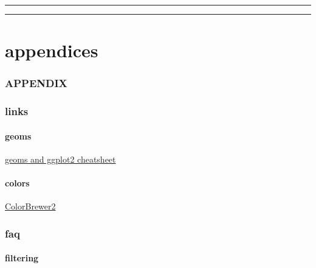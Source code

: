\documentclass[
]{krantz}
\begin{document}
\begin{center}\rule{0.5\linewidth}{0.5pt}\end{center}

\begin{center}\rule{0.5\linewidth}{0.5pt}\end{center}

\hypertarget{part-appendices}{%
\part{appendices}\label{part-appendices}}

\hypertarget{section-1}{%
\section*{}\label{section-1}}

\hypertarget{appendix}{%
\section*{APPENDIX}\label{appendix}}

\hypertarget{links}{%
\section{links}\label{links}}

\hypertarget{geoms-1}{%
\subsection{geoms}\label{geoms-1}}

\href{https://thebustalab.github.io/R_For_Chemists_3/images/ggplot2_geoms.pdf}{geoms and ggplot2 cheatsheet}

\hypertarget{colors}{%
\subsection{colors}\label{colors}}

\href{https://colorbrewer2.org/}{ColorBrewer2}

\hypertarget{faq}{%
\section{faq}\label{faq}}

\hypertarget{filtering}{%
\subsection{filtering}\label{filtering}}
\end{document}

